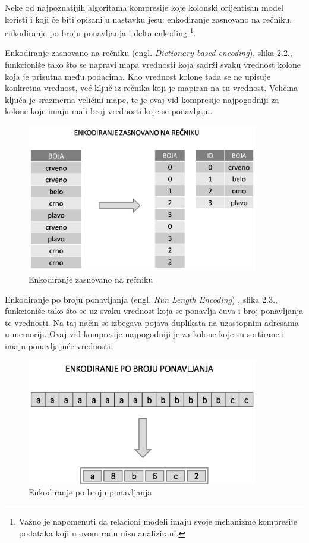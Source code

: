 \documentclass[12pt,oneside]{memoir}
\begin{document}
Neke od najpoznatijih algoritama kompresije koje kolonski orijentisan model koristi i koji će biti opisani u nastavku jesu: enkodiranje zasnovano na rečniku, enkodiranje po broju ponavljanja i delta enkoding \cite{ColumnarOptimizations}\footnote{Važno je napomenuti da relacioni modeli imaju svoje mehanizme kompresije podataka koji u ovom radu nisu analizirani.}.

Enkodiranje zasnovano na rečniku (engl. \textit{Dictionary based encoding}), slika 2.2., funkcioniše tako što se napravi mapa vrednosti koja sadrži svaku vrednost kolone koja je prisutna među podacima. Kao vrednost kolone tada se ne upisuje konkretna vrednost, već ključ iz rečnika koji je mapiran na tu vrednost. Veličina ključa je srazmerna veličini mape, te je ovaj vid kompresije najpogodniji za kolone koje imaju mali broj vrednosti koje se ponavljaju.

\begin{figure}[!ht]
  \centering
  \includegraphics[width=0.9\textwidth]{DictionaryEncoding.png}
  \caption{Enkodiranje zasnovano na rečniku}
  \label{fig:grafikon}
\end{figure}


Enkodiranje po broju ponavljanja  (engl. \textit{Run Length Encoding}) , slika 2.3., funkcioniše tako što se uz svaku vrednost koja se ponavlja čuva i broj ponavljanja te vrednosti. Na taj način se izbegava pojava duplikata na uzastopnim adresama u memoriji. Ovaj vid kompresije najpogodniji je za kolone koje su sortirane i imaju ponavljajuće vrednosti.
\pagebreak


\begin{figure}[!ht]
  \centering
  \includegraphics[width=0.9\textwidth]{run-length-encoding.png}
  \caption{Enkodiranje po broju ponavljanja}
  \label{fig:grafikon}
\end{figure}
\end{document}
